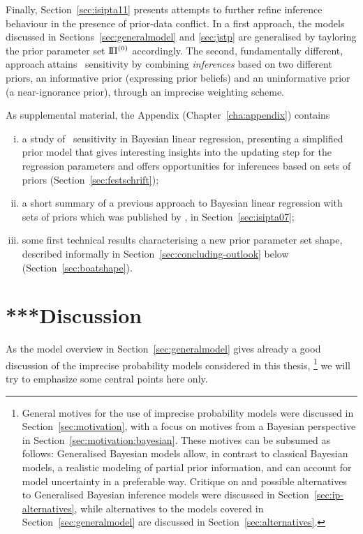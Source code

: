 Finally, Section~\ref{sec:isipta11} presents attempts to further refine
inference behaviour in the presence of prior-data conflict.
In a first approach, the models discussed in Sections~\ref{sec:generalmodel} and \ref{sec:jstp}
are generalised by tayloring the prior parameter set $\text{I}\!\Pi^{(0)}$ accordingly.
The second, fundamentally different, approach attains \pdc\ sensitivity
by combining \emph{inferences} based on two different priors,
an informative prior (expressing prior beliefs) and an uninformative prior (a near-ignorance prior),
through an imprecise weighting scheme.

As supplemental material, the Appendix (Chapter~\ref{cha:appendix}) contains
\begin{enumerate}[(i)]
\item a study of \pdc\ sensitivity in Bayesian linear regression,
presenting a simplified prior model that gives interesting insights into the updating step
for the regression parameters and offers opportunities for inferences based on sets of priors
(Section~\ref{sec:festschrift});
\item a short summary of a previous approach to Bayesian linear regression
with sets of priors which was published by \textcite{Walter2007a}, in Section~\ref{sec:isipta07};
\item some first technical results characterising a new prior parameter set shape,
described informally in Section~\ref{sec:concluding-outlook} below
(Section~\ref{sec:boatshape}).
\end{enumerate}


\section{***Discussion}
\label{sec:concluding-discussion}


As the model overview in Section~\ref{sec:generalmodel} gives already a good discussion
of the imprecise probability models considered in this thesis,%
\footnote{General motives for the use of imprecise probability models
were discussed in Section~\ref{sec:motivation},
with a focus on motives from a Bayesian perspective in Section~\ref{sec:motivation:bayesian}.
These motives can be subsumed as follows:
Generalised Bayesian models allow, in contrast to classical Bayesian models,
a realistic modeling of partial prior information,
and can account for model uncertainty in a preferable way.
Critique on and possible alternatives to Generalised Bayesian inference models
were discussed in Section~\ref{sec:ip-alternatives},
while alternatives to the models covered in Section~\ref{sec:generalmodel} are discussed in Section~\ref{sec:alternatives}.}
we will try to emphasize some central points here only.

